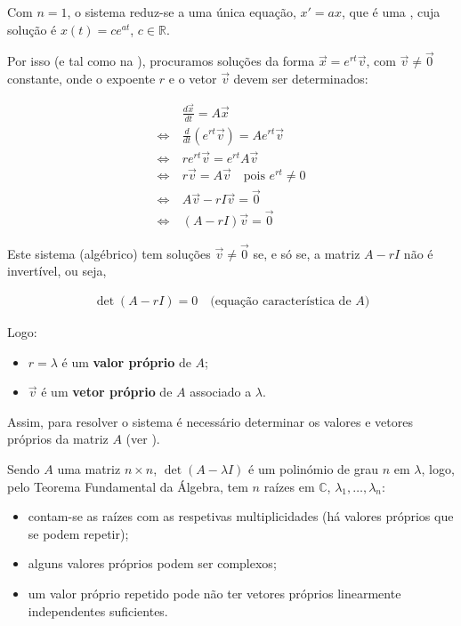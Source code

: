 \documentclass{article}
\begin{document}
Com $n = 1$, o sistema reduz-se a uma única equação, $x' = ax$, que é uma
, cuja solução é $x(t) = c e^{at}$, $c \in \mathbb{R}$.

\smallskip

Por isso (e tal como na ), procuramos
soluções da forma $\vec{x} = e^{rt}\vec{v}$, com $\vec{v} \neq \vec{0}$ constante, onde o expoente $r$ e
o vetor $\vec{v}$ devem ser determinados:

\begin{align*}
& \frac{d\vec{x}}{dt} = A\vec{x} \\
\Leftrightarrow \ & \frac{d}{dt}\left( e^{rt}\vec{v} \right) = A e^{rt}\vec{v} \\
\Leftrightarrow \ & r e^{rt}\vec{v} = e^{rt} A\vec{v} \\
\Leftrightarrow \ & r\vec{v} = A\vec{v} \quad \text{pois } e^{rt} \neq 0 \\
\Leftrightarrow \ & A\vec{v} - rI\vec{v} = \vec{0} \\
\Leftrightarrow \ & (A - rI)\vec{v} = \vec{0}
\end{align*}

Este sistema (algébrico) tem soluções $\vec{v} \neq \vec{0}$ se, e só se, a matriz $A - rI$ não é
invertível, ou seja,

\begin{gather*}
\det(A - rI) = 0 \quad \text{(equação característica de } A \text{)}
\end{gather*}

Logo:

\begin{itemize}
    \item $r = \lambda$ é um \textbf{valor próprio} de $A$;
    \item $\vec{v}$ é um \textbf{vetor próprio} de $A$ associado a $\lambda$.
\end{itemize}

Assim, para resolver o sistema é necessário determinar os valores e vetores próprios da matriz $A$
(ver ).

\smallskip

Sendo $A$ uma matriz $n \times n$, $\det(A - \lambda I)$ é um polinómio de grau $n$ em $\lambda$, logo,
pelo Teorema Fundamental da Álgebra, tem $n$ raízes em $\mathbb{C}$, $\lambda_1, \ldots, \lambda_n$:

\begin{itemize}
    \item contam-se as raízes com as respetivas multiplicidades (há valores próprios que se podem repetir);
    \item alguns valores próprios podem ser complexos;
    \item um valor próprio repetido pode não ter vetores próprios linearmente independentes suficientes.
\end{itemize}
\end{document}
